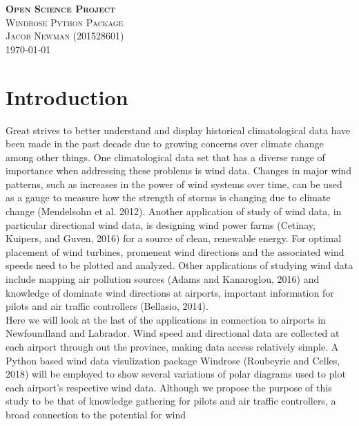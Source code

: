 \documentclass{article}
\begin{document}
\begin{titlepage}
\newcommand{\HRule}{\rule{\linewidth}{0.5mm}}

\center
\textsc{\LARGE \textbf{Open Science Project}}\\[1 cm]

\textsc{\Large Windrose Python Package}\\[0.5 cm]

\textsc{\large Jacob Newman (201528601)}\\[0.5 cm]





\vfill\vfill\vfill
{\large\today}
\vfill

\end{titlepage}


\section{Introduction}\label{Introduction}
Great strives to better understand and display historical climatological data have been made in the past decade due to growing concerns over climate change among other things. One climatological data set 
that has a diverse range of importance when addressing these problems is wind data. Changes in major wind patterns, such as increases in the power of wind systems over time, can be used as a gauge to 
measure how the strength of storms is changing due to climate change (Mendelsohn et al. 2012). Another application of study of wind data, in particular directional wind data, is designing wind power 
farms (Cetinay, Kuipers, and Guven, 2016) for a source of clean, renewable energy. For optimal placement of wind turbines, promenent wind directions and the associated wind speeds need to be plotted and 
analyzed. Other applications of studying wind data include mapping air pollution sources (Adams and Kanaroglou, 2016) and knowledge of dominate wind directions at airports, important information for 
pilots and air traffic controllers (Bellasio, 2014).
\\
\indent Here we will look at the last of the applications in connection to airports in Newfoundland and Labrador. Wind speed and directional data are collected at each airport through out the province, 
making data access relatively simple. A Python based wind data visulization package Windrose (Roubeyrie and Celles, 2018) will be employed to show several variations of polar diagrams used to plot each 
airport's respective wind data. Although we propose the purpose of this study to be that of knowledge gathering for pilots and air traffic controllers, a broad connection to the potential for wind 
\end{document}
